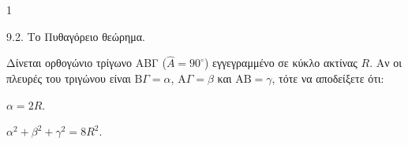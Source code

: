 \begin{ylh}{1}
    \item 9.2. Το Πυθαγόρειο θεώρημα.
\end{ylh}
Δίνεται ορθογώνιο τρίγωνο ΑΒΓ ($\hat{A} = 90^\circ$) εγγεγραμμένο σε κύκλο ακτίνας $R$.
Αν οι πλευρές του τριγώνου είναι $\text{B}\Gamma = \alpha$, $\text{A}\Gamma = \beta$ και $\text{A}\text{B} = \gamma$, τότε να αποδείξετε ότι:
\begin{alist}
\item $\alpha = 2R$. 
\item $\alpha^2 + \beta^2 + \gamma^2 = 8R^2$. 
\end{alist}